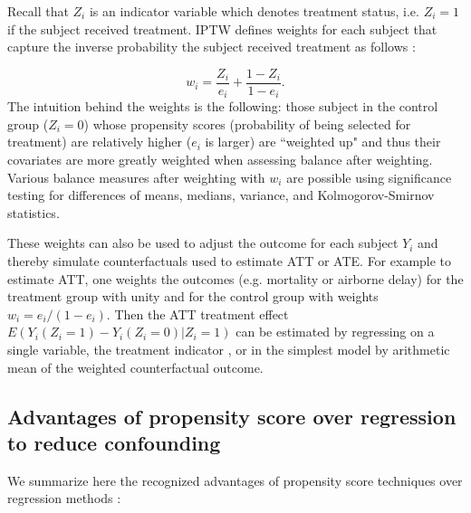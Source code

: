 \documentclass[11pt]{scrartcl}
\begin{document}
Recall that $Z_i$ is an indicator variable which denotes treatment status, i.e. $Z_i=1$ if the subject received treatment.  IPTW defines weights for each subject that capture the inverse probability the subject received treatment as follows \cite{austin2011introduction}:

\begin{equation}
w_i = \frac{Z_i}{e_i} + \frac{1-Z_i}{1-e_i}.
\end{equation}
The intuition behind the weights is the following: those subject in the control group ($Z_i=0$) whose propensity scores (probability of being selected for treatment) are relatively higher ($e_i$ is  larger) are ``weighted up" and thus their covariates are more greatly weighted when assessing balance after weighting.  Various balance measures after weighting with $w_i$ are possible using significance testing for differences of means, medians, variance, and Kolmogorov-Smirnov statistics\cite{ridgeway2015toolkit}.   

These weights can also be used to adjust the outcome for each subject $Y_i$ and thereby simulate counterfactuals used to estimate ATT or ATE.  For example to estimate ATT, one weights the outcomes (e.g. mortality or airborne delay) for the treatment group with unity and for the control group with weights $w_i=e_i/(1-e_i)$.  Then the ATT treatment effect $E(Y_i(Z_i=1)-Y_i(Z_i=0)|Z_i=1)$ can be estimated by regressing on a single variable, the treatment indicator \cite{ridgeway2015toolkit}, or in the simplest model by arithmetic mean of the weighted counterfactual outcome.  


\subsection*{Advantages of propensity score over regression to reduce confounding}
We summarize here the recognized advantages of propensity score techniques over regression methods \cite{mccaffrey2013tutorial}:
\end{document}
